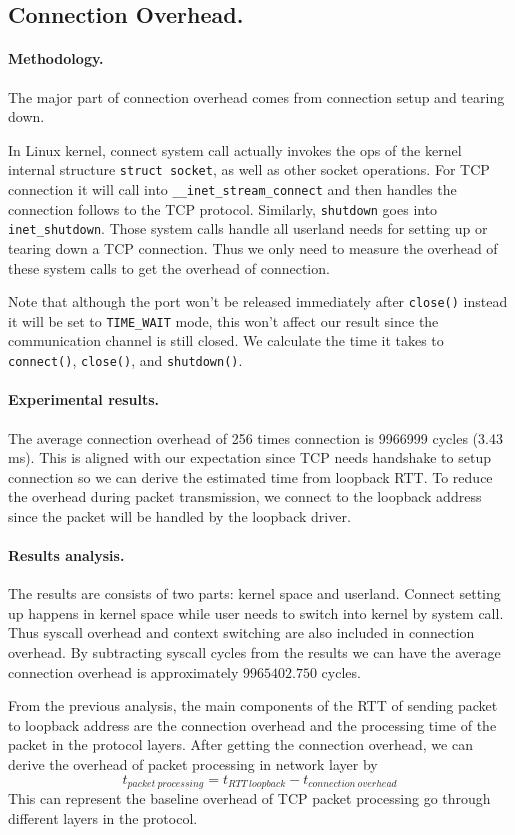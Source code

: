 \subsection{Connection Overhead.} 
\paragraph{Methodology.} The major part of connection overhead comes from connection setup and tearing down. 

In Linux kernel, connect system call actually invokes the ops of the kernel internal structure \texttt{struct socket}, as well as other socket operations. For TCP connection it will call into \texttt{\_\_inet\_stream\_connect} and then handles the connection follows to the TCP protocol. Similarly, \texttt{shutdown} goes into \texttt{inet\_shutdown}. Those system calls handle all userland needs for setting up or tearing down a TCP connection. Thus we only need to measure the overhead of these system calls to get the overhead of connection.

Note that although the port won't be released immediately after \texttt{close()} instead it will be set to \texttt{TIME\_WAIT} mode, this won't affect our result since the communication channel is still closed. We calculate the time it takes to \texttt{connect()}, \texttt{close()}, and \texttt{shutdown()}.

\paragraph{Experimental results.} The average connection overhead of 256 times connection is 9966999 cycles (3.43 ms). This is aligned with our expectation since TCP needs handshake to setup connection so we can derive the estimated time from loopback RTT. To reduce the overhead during packet transmission, we connect to the loopback address since the packet will be handled by the loopback driver.

\paragraph{Results analysis.} The results are consists of two parts: kernel space and userland. Connect setting up happens in kernel space while user needs to switch into kernel by system call. Thus syscall overhead and context switching are also included in connection overhead. By subtracting syscall cycles from the results we can have the average connection overhead is approximately $9965402.750$ cycles.

From the previous analysis, the main components of the RTT of sending packet to loopback address are the connection overhead and the processing time of the packet in the protocol layers. After getting the connection overhead, we can derive the overhead of packet processing in network layer by
\begin{equation}
    t_{packet\ processing}=t_{RTT\ loopback}-t_{connection\ overhead}
\end{equation}
This can represent the baseline overhead of TCP packet processing go through different layers in the protocol.
